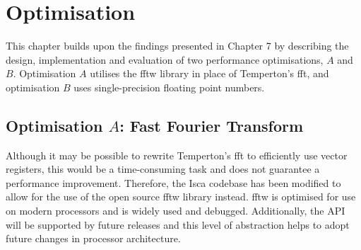 \documentclass[a4paper,11pt]{report}
\begin{document}
\let\textcircled=\pgftextcircled
\chapter[Optimisation]{Optimisation}
\label{chap:optimiations}
This chapter builds upon the findings presented in Chapter 7 by describing the design, implementation and evaluation of two performance optimisations, $A$ and $B$. Optimisation $A$ utilises the \gls{fftw} library in place of Temperton's \gls{fft}, and optimisation $B$ uses single-precision floating point numbers. 

\section[Optimisation $A$: Fast Fourier Transform]{Optimisation $A$: Fast Fourier Transform}
Although it may be possible to rewrite Temperton's \gls{fft} to efficiently use vector registers, this would be a time-consuming task and does not guarantee a performance improvement. Therefore, the Isca codebase has been modified to allow for the use of the open source \gls{fftw} library instead. \gls{fftw} is optimised for use on modern processors and is widely used and debugged. Additionally, the API will be supported by future releases and this level of abstraction helps to adopt future changes in processor architecture.
\end{document}
